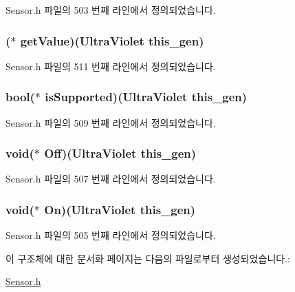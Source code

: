 Sensor.\-h 파일의 503 번째 라인에서 정의되었습니다.

\hypertarget{struct___ultra_violet_ad2f32aac4a27630b46e825c41eee7eb3}{
\subsubsection[{get\-Value}]{($\ast$  get\-Value)({\bf Ultra\-Violet} this\-\_\-gen)}}\label{struct___ultra_violet_ad2f32aac4a27630b46e825c41eee7eb3}


Sensor.\-h 파일의 511 번째 라인에서 정의되었습니다.

\hypertarget{struct___ultra_violet_a3c866c9d5dac5b54f8dabd80f2111c4c}{
\subsubsection[{is\-Supported}]{\setlength{\rightskip}{0pt plus 5cm}bool($\ast$  is\-Supported)({\bf Ultra\-Violet} this\-\_\-gen)}}\label{struct___ultra_violet_a3c866c9d5dac5b54f8dabd80f2111c4c}


Sensor.\-h 파일의 509 번째 라인에서 정의되었습니다.

\hypertarget{struct___ultra_violet_a4eaa529090e12bd7eb2a2c568f0c0539}{
\subsubsection[{Off}]{\setlength{\rightskip}{0pt plus 5cm}void($\ast$  Off)({\bf Ultra\-Violet} this\-\_\-gen)}}\label{struct___ultra_violet_a4eaa529090e12bd7eb2a2c568f0c0539}


Sensor.\-h 파일의 507 번째 라인에서 정의되었습니다.

\hypertarget{struct___ultra_violet_a753f8c2c790a977e4d8cd2e68ee10e76}{
\subsubsection[{On}]{\setlength{\rightskip}{0pt plus 5cm}void($\ast$  On)({\bf Ultra\-Violet} this\-\_\-gen)}}\label{struct___ultra_violet_a753f8c2c790a977e4d8cd2e68ee10e76}


Sensor.\-h 파일의 505 번째 라인에서 정의되었습니다.



이 구조체에 대한 문서화 페이지는 다음의 파일로부터 생성되었습니다.\-:\begin{DoxyCompactItemize}
\item 
\hyperlink{_sensor_8h}{Sensor.\-h}\end{DoxyCompactItemize}
